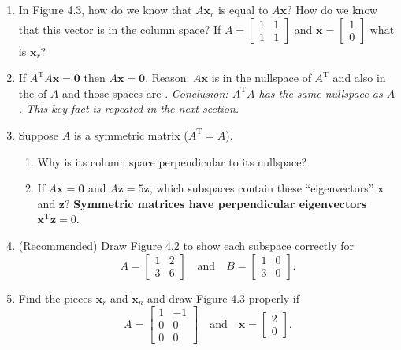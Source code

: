\documentclass[14pt, a4paper]{article}
\begin{document}
\begin{enumerate}
    \item In Figure 4.3, how do we know that $A\boldsymbol{x}_r$ is equal to $A\boldsymbol{x}$? How do we know that this vector is in the column space? If $A = \begin{bmatrix} 1 & 1 \\ 1 & 1 \end{bmatrix}$ and $\boldsymbol{x} = \begin{bmatrix} 1 \\ 0 \end{bmatrix}$ what is $\boldsymbol{x}_r$?

    \item If $A^{\mathrm{T}}A\boldsymbol{x} = \boldsymbol{0}$ then $A\boldsymbol{x} = \boldsymbol{0}$. Reason: $A\boldsymbol{x}$ is in the nullspace of $A^{\mathrm{T}}$ and also in the \underline{\hspace{1.5cm}} of $A$ and those spaces are \underline{\hspace{1.5cm}}. \emph{Conclusion: $A^{\mathrm{T}}A$ has the same nullspace as $A$. This key fact is repeated in the next section.}

    \item Suppose $A$ is a symmetric matrix ($A^{\mathrm{T}} = A$).
          \begin{enumerate}
              \item Why is its column space perpendicular to its nullspace?
              \item If $A\boldsymbol{x} = \boldsymbol{0}$ and $A\boldsymbol{z} = 5\boldsymbol{z}$, which subspaces contain these ``eigenvectors'' $\boldsymbol{x}$ and $\boldsymbol{z}$? \textbf{Symmetric matrices have perpendicular eigenvectors} $\boldsymbol{x}^{\mathrm{T}}\boldsymbol{z} = 0$.
          \end{enumerate}

    \item (Recommended) Draw Figure 4.2 to show each subspace correctly for
          \[
              A = \begin{bmatrix} 1 & 2 \\ 3 & 6 \end{bmatrix} \quad \text{and} \quad
              B = \begin{bmatrix} 1 & 0 \\ 3 & 0 \end{bmatrix}.
          \]

    \item Find the pieces $\boldsymbol{x}_r$ and $\boldsymbol{x}_n$ and draw Figure 4.3 properly if
          \[
              A = \begin{bmatrix} 1 & -1 \\ 0 & 0 \\ 0 & 0 \end{bmatrix} \quad \text{and} \quad
              \boldsymbol{x} = \begin{bmatrix} 2 \\ 0 \end{bmatrix}.
          \]
\end{enumerate}
\end{document}
